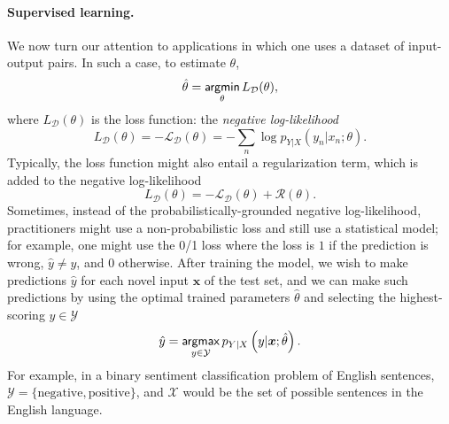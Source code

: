 \paragraph*{Supervised learning.} We now turn our attention to applications
in which one uses a dataset of input-output pairs. In such a case,
to estimate $\theta$,
%
\begin{equation}
    \hat{\theta} = \operatorname*{\mathsf{argmin}}_\theta L_\mathcal{D}(\theta),
\end{equation}
%
where $L_\mathcal{D}(\theta)$ is the loss function:
the \textit{negative log-likelihood}
%
\begin{equation}
    L_\mathcal{D}(\theta) = -\mathcal{L}_\mathcal{D}(\theta) =
    - \sum_n \log p_{Y|X}(y_n|x_n; \theta).
\end{equation}
%
Typically, the loss function might also entail a regularization term,
which is added to the negative log-likelihood
%
\begin{equation}
    L_\mathcal{D}(\theta) = -\mathcal{L}_\mathcal{D}(\theta) + \mathcal{R}(\theta).
\end{equation}
%
Sometimes, instead of the probabilistically-grounded negative
log-likelihood, practitioners might use a non-probabilistic loss and
still use a statistical model; for example, one might use the 0/1
loss where the loss is $1$ if the prediction is wrong, \ie
$\hat{y}\neq y$, and $0$ otherwise. After training the model, we wish
to make predictions $\hat{y}$ for each novel input $\bm{x}$ of the
test set, and we can make such predictions by using the optimal
trained parameters $\hat{\theta}$ and selecting the highest-scoring
$y\in\mathcal{Y}$
%
\begin{equation}
    \hat{y}=\operatorname*{\mathsf{argmax}}_{y\in\mathcal{Y}}p_{Y|X}\left(y|\bm{x};\hat{\theta}\right).
\end{equation}
%
For example, in a binary sentiment classification problem of English
sentences, $\mathcal{Y}=\{\text{negative},\text{positive}\}$, and
$\mathcal{X}$ would be the set of possible sentences in the English
language.


